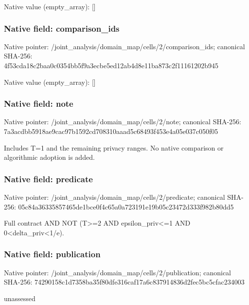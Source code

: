 \documentclass[10pt,a4paper]{article}
\begin{document}
Native value (empty\_\allowbreak{}array): []

\subsubsection{Native field: comparison\_\allowbreak{}ids}
Native pointer: /joint\_\allowbreak{}analysis/domain\_\allowbreak{}map/cells/2/comparison\_\allowbreak{}ids; canonical SHA-256: 4f53cda18c2baa0c0354bb5f9a3ecbe5ed12ab4d8e11ba873c2f11161202b945

Native value (empty\_\allowbreak{}array): []

\subsubsection{Native field: note}
Native pointer: /joint\_\allowbreak{}analysis/domain\_\allowbreak{}map/cells/2/note; canonical SHA-256: 7a3acdbb5918ae9cac97b1592cd708310aaad5c68493f453e4a05e037c050f05

\begingroup\raggedright\sloppy Includes T=\allowbreak{}1 and the remaining privacy ranges. No native comparison or algorithmic adoption is added.\par\endgroup

\subsubsection{Native field: predicate}
Native pointer: /joint\_\allowbreak{}analysis/domain\_\allowbreak{}map/cells/2/predicate; canonical SHA-256: 05c84a36335857465de1bce0f4c65a0a723191e19b05c23472d333f982b80dd5

\begingroup\raggedright\sloppy Full contract AND NOT (T>=\allowbreak{}2 AND epsilon\_\allowbreak{}priv<=\allowbreak{}1 AND 0<delta\_\allowbreak{}priv<1/\allowbreak{}e).\par\endgroup

\subsubsection{Native field: publication}
Native pointer: /joint\_\allowbreak{}analysis/domain\_\allowbreak{}map/cells/2/publication; canonical SHA-256: 74290158c1d7358ba35f80dfe316caf17a6c837914836d2fec5bc5cfac234003

\begingroup\raggedright\sloppy unassessed\par\endgroup
\end{document}
